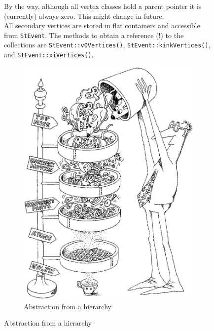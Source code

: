 \documentclass[twoside]{article}
\begin{document}
\begin{figure}[htb]
\begin{center}
By the way, although all vertex classes hold a parent pointer it is
(currently) always zero. This might change in future. \\
All secondary vertices are stored in flat containers and accessible
from \texttt{StEvent}. The methods to obtain a reference (!) to the
collections are \texttt{StEvent::v0Vertices()},
\texttt{StEvent::kinkVertices()}, and \texttt{StEvent::xiVertices()}.
\begin{figure}[htb]
    \begin{center}
        \includegraphics[height=0.7\textheight]{cartoon3.eps}
        \caption{Abstraction from a hierarchy}
    \end{center}
\end{figure}


\end{center}
\end{figure}
\end{document}
